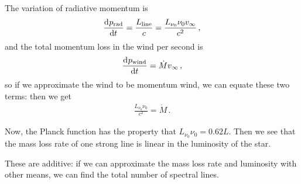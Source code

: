 \documentclass[main.tex]{subfiles}
\begin{document}
The variation of radiative momentum is 
%
\begin{align}
  \dv[]{p _{\text{rad}}}{t} = \frac{L _{\text{line}}}{c}
  = \frac{L_{\nu_0 } \nu_0 v_{\infty}}{c^2}
\,,
\end{align}
%
and the total momentum loss in the wind per second is 
%
\begin{align}
  \dv[]{p _{\text{wind}}}{t} = \dot{M} v_{\infty} 
\,,
\end{align}
%
so if we approximate the wind to be momentum wind, we can equate these two terms: then we get 
%
\begin{align}
  \frac{L_{\nu_0 } \nu_0}{c^2} = \dot{M} 
\,.
\end{align}

Now, the Planck function has the property that \(L_{\nu_0  } \nu_0 = 0.62 L\).
Then we see that the mass loss rate of one strong line is linear in the luminosity of the star.

These are additive: if we can approximate the mass loss rate and luminosity with other means, we can find the total number of spectral lines.
\end{document}
